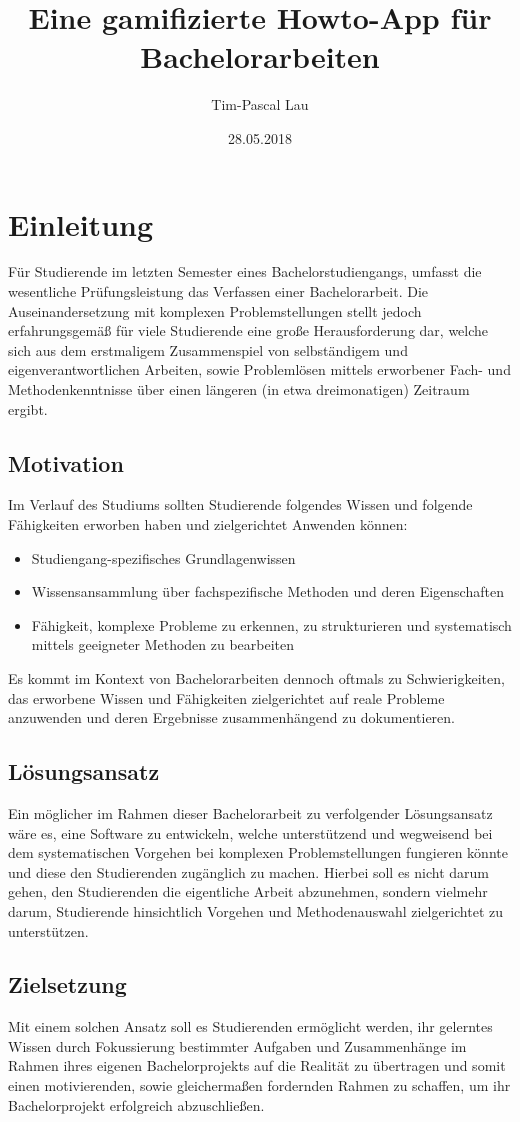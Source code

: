 \documentclass{scrreprt}
\title{Eine gamifizierte Howto-App für Bachelorarbeiten}
\author{Tim-Pascal Lau}
\date{28.05.2018}
\begin{document}
\maketitle
\tableofcontents
\chapter{Einleitung}
Für Studierende im letzten Semester eines Bachelorstudiengangs, umfasst die wesentliche Prüfungsleistung das Verfassen einer Bachelorarbeit.
Die Auseinandersetzung mit komplexen Problemstellungen stellt jedoch erfahrungsgemäß für viele Studierende eine große Herausforderung dar, welche sich aus dem erstmaligem Zusammenspiel von selbständigem und eigenverantwortlichen Arbeiten, sowie Problemlösen mittels erworbener Fach- und Methodenkenntnisse über einen längeren (in etwa dreimonatigen) Zeitraum ergibt.
\section{Motivation}
Im Verlauf des Studiums sollten Studierende folgendes Wissen und folgende Fähigkeiten erworben haben und zielgerichtet Anwenden können:
\begin{itemize}
\item Studiengang-spezifisches Grundlagenwissen
\item Wissensansammlung über fachspezifische Methoden und deren Eigenschaften
\item Fähigkeit, komplexe Probleme zu erkennen, zu strukturieren und systematisch mittels geeigneter Methoden zu bearbeiten
\end{itemize}
Es kommt im Kontext von Bachelorarbeiten dennoch oftmals zu Schwierigkeiten, das erworbene Wissen und Fähigkeiten zielgerichtet auf reale Probleme anzuwenden und deren Ergebnisse zusammenhängend zu dokumentieren.
\section{Lösungsansatz}
Ein möglicher im Rahmen dieser Bachelorarbeit zu verfolgender Lösungsansatz wäre es, eine Software zu entwickeln, welche unterstützend und wegweisend bei dem systematischen Vorgehen bei komplexen Problemstellungen fungieren könnte und diese den Studierenden zugänglich zu machen.
Hierbei soll es nicht darum gehen, den Studierenden die eigentliche Arbeit abzunehmen, sondern vielmehr darum, Studierende hinsichtlich Vorgehen und Methodenauswahl zielgerichtet zu unterstützen.
\section{Zielsetzung}
Mit einem solchen Ansatz soll es Studierenden ermöglicht werden, ihr gelerntes Wissen durch Fokussierung bestimmter Aufgaben und Zusammenhänge im Rahmen ihres eigenen Bachelorprojekts auf die Realität zu übertragen und somit einen motivierenden, sowie gleichermaßen fordernden Rahmen zu schaffen, um ihr Bachelorprojekt erfolgreich abzuschließen.
\end{document}
